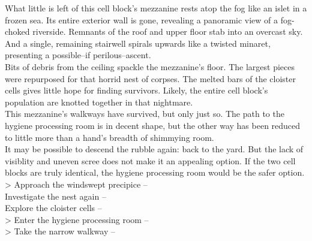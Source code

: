 What little is left of this cell block’s mezzanine rests atop the fog like an islet in a frozen sea. Its entire exterior wall is gone, revealing a panoramic view of a fog-choked riverside. Remnants of the roof and upper floor stab into an overcast sky. And a single, remaining stairwell spirals upwards like a twisted minaret, presenting a possible--if perilous--ascent.\\

Bits of debris from the ceiling spackle the mezzanine's floor. The largest pieces were repurposed for that horrid nest of corpses. The melted bars of the cloister cells gives little hope for finding survivors. Likely, the entire cell block's population are knotted together in that nightmare.\\

This mezzanine's walkways have survived, but only just so. The path to the hygiene processing room is in decent shape, but the other way has been reduced to little more than a hand's breadth of shimmying room.\\

It may be possible to descend the rubble again: back to the yard. But the lack of visiblity and uneven scree does not make it an appealing option. If the two cell blocks are truly identical, the hygiene processing room would be the safer option.\\

> Approach the windswept precipice -- \\
 Investigate the nest again -- \\
 Explore the cloister cells -- \\
> Enter the hygiene processing room -- \\
> Take the narrow walkway -- 